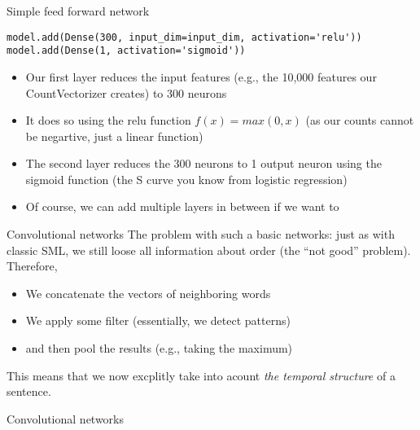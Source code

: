 \begin{frame}[fragile]{Simple feed forward network}
\begin{lstlisting}
model.add(Dense(300, input_dim=input_dim, activation='relu'))
model.add(Dense(1, activation='sigmoid'))
\end{lstlisting}	
	
\begin{itemize}[<+->]
\item Our first layer reduces the input features (e.g., the 10,000 features our CountVectorizer creates) to 300 neurons
\item It does so using the relu function $f(x) = max(0, x)$ (as our counts cannot be negartive, just a linear function)
\item The second layer reduces the 300 neurons to 1 output neuron using the sigmoid function (the S curve you know from logistic regression)
\item Of course, we can add multiple layers in between if we want to
\end{itemize}
\end{frame}





\begin{frame}{Convolutional networks}
  The problem with such a basic networks: just as with classic SML, we still loose all information about order (the ``not good'' problem).
  Therefore,
  \begin{itemize}
  \item We concatenate the vectors of neighboring words
  \item We apply some filter (essentially, we detect patterns)
  \item and then pool the results (e.g., taking the maximum)
  \end{itemize}
  This means that we now excplitly take into acount \emph{the temporal structure} of a sentence.
\end{frame}



\begin{frame}{Convolutional networks}
\end{frame}



